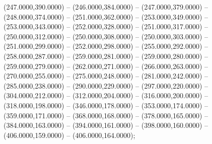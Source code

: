 \begin{scope}[draw=black,fill=c2b83ba,line join=round,line width=0.208pt]
    (247.0000,390.0000) -- (246.0000,384.0000) -- (247.0000,379.0000) --
    (248.0000,374.0000) -- (251.0000,362.0000) -- (253.0000,349.0000) --
    (253.0000,343.0000) -- (252.0000,328.0000) -- (251.0000,317.0000) --
    (250.0000,312.0000) -- (250.0000,308.0000) -- (250.0000,303.0000) --
    (251.0000,299.0000) -- (252.0000,298.0000) -- (255.0000,292.0000) --
    (258.0000,287.0000) -- (259.0000,281.0000) -- (259.0000,280.0000) --
    (259.0000,279.0000) -- (262.0000,271.0000) -- (266.0000,263.0000) --
    (270.0000,255.0000) -- (275.0000,248.0000) -- (281.0000,242.0000) --
    (285.0000,238.0000) -- (290.0000,229.0000) -- (297.0000,220.0000) --
    (304.0000,212.0000) -- (312.0000,204.0000) -- (316.0000,200.0000) --
    (318.0000,198.0000) -- (346.0000,178.0000) -- (353.0000,174.0000) --
    (359.0000,171.0000) -- (368.0000,168.0000) -- (378.0000,165.0000) --
    (384.0000,163.0000) -- (394.0000,161.0000) -- (398.0000,160.0000) --
    (406.0000,159.0000) -- (406.0000,164.0000);
\end{scope}
